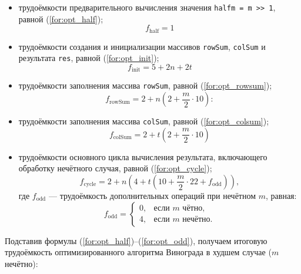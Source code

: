 \begin{itemize}
	\item[---] трудоёмкости предварительного вычисления значения \texttt{halfm = m >> 1}, равной (\ref{for:opt_half});
	\begin{equation}
		\label{for:opt_half}
		f_{\mathrm{half}} = 1
	\end{equation}
	
	\item[---] трудоёмкости создания и инициализации массивов \texttt{rowSum}, \texttt{colSum} и результата \texttt{res}, равной (\ref{for:opt_init});
	\begin{equation}
		\label{for:opt_init}
		f_{\mathrm{init}} = 5 + 2n + 2t
	\end{equation}
	
	\item[---] трудоёмкости заполнения массива \texttt{rowSum}, равной (\ref{for:opt_rowsum});
	\begin{equation}
		\label{for:opt_rowsum}
		f_{\mathrm{rowSum}} = 2 + n \left( 2 + \frac{m}{2} \cdot 10 \right):
	\end{equation}
	
	\item[---] трудоёмкости заполнения массива \texttt{colSum}, равной (\ref{for:opt_colsum});
	\begin{equation}
		\label{for:opt_colsum}
		f_{\mathrm{colSum}} = 2 + t \left( 2 + \frac{m}{2} \cdot 10 \right)
	\end{equation}
	
	\item[---] трудоёмкости основного цикла вычисления результата, включающего обработку нечётного случая, равной (\ref{for:opt_cycle});
	\begin{equation}
		\label{for:opt_cycle}
		f_{\mathrm{cycle}} = 2 + n \left( 4 + t \left( 10 + \frac{m}{2} \cdot 22 + f_{\mathrm{odd}} \right) \right),
	\end{equation}
	где \( f_{\mathrm{odd}} \) — трудоёмкость дополнительных операций при нечётном \( m \), равная:
	\begin{equation}
		\label{for:opt_odd}
		f_{\mathrm{odd}} =
		\begin{cases}
			0, & \text{если } m \text{ чётно}, \\
			4, & \text{если } m \text{ нечётно}.
		\end{cases}
	\end{equation}
\end{itemize}

Подставив формулы (\ref{for:opt_half})–(\ref{for:opt_odd}), получаем итоговую трудоёмкость оптимизированного алгоритма Винограда в худшем случае (\( m \) нечётно):

